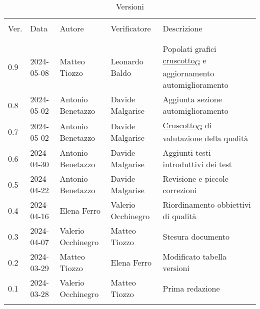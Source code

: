 \documentclass[italian,12pt]{article} %
\begin{document}

\newpage

\captionsetup[table]{list=no}
\begin{table}[!h]
	\caption*{Versioni}
	\footnotesize
	\begin{center}
		\begin{tabular}{ l l l l p{6cm} }
			\hline                                                                                                                     \\[-2ex]
			Ver. & Data       & Autore             & Verificatore       & Descrizione                                                  \\
			\\[-2ex] \hline \\[-1.5ex]
			0.9  & 2024-05-08 & Matteo Tiozzo      & Leonardo Baldo     & Popolati grafici \href{https://7last.github.io/docs/rtb/documentazione-interna/glossario\#cruscotto}{cruscotto\textsubscript{G}} e aggiornamento automiglioramento \\
			0.8  & 2024-05-02 & Antonio Benetazzo  & Davide Malgarise   & Aggiunta sezione automiglioramento                           \\
			0.7  & 2024-05-02 & Antonio Benetazzo  & Davide Malgarise   & \href{https://7last.github.io/docs/rtb/documentazione-interna/glossario\#cruscotto}{Cruscotto\textsubscript{G}} di valutazione della qualità                       \\
			0.6  & 2024-04-30 & Antonio Benetazzo  & Davide Malgarise   & Aggiunti testi introduttivi dei test                         \\
			0.5  & 2024-04-22 & Antonio Benetazzo  & Davide Malgarise   & Revisione e piccole correzioni                               \\
			0.4  & 2024-04-16 & Elena Ferro        & Valerio Occhinegro & Riordinamento obbiettivi di qualità                          \\
			0.3  & 2024-04-07 & Valerio Occhinegro & Matteo Tiozzo      & Stesura documento                                            \\
			0.2  & 2024-03-29 & Matteo Tiozzo      & Elena Ferro        & Modificato tabella versioni                                  \\
			0.1  & 2024-03-28 & Valerio Occhinegro & Matteo Tiozzo      & Prima redazione                                              \\
			\\[-1.5ex] \hline
		\end{tabular}
	\end{center}
\end{table}
\captionsetup[table]{list=yes}
\newpage
\tableofcontents
\listoftables
\listoffigures
\newpage





\end{document}
